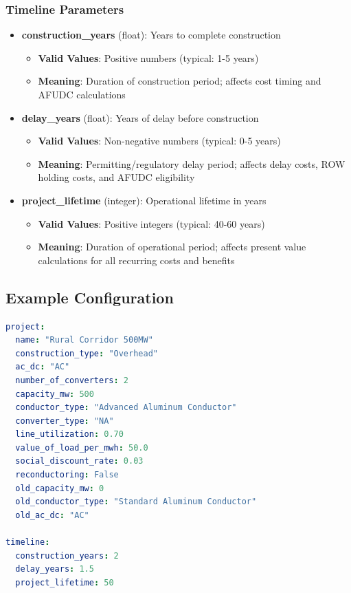 \documentclass[ctcc_full_documentation.tex]{subfiles}
\begin{document}
\subsubsection{Timeline Parameters}

\begin{itemize}
    \item \textbf{construction\_years} (float): Years to complete construction
    \begin{itemize}
        \item \textbf{Valid Values}: Positive numbers (typical: 1-5 years)
        \item \textbf{Meaning}: Duration of construction period; affects cost timing and AFUDC calculations
    \end{itemize}
    
    \item \textbf{delay\_years} (float): Years of delay before construction
    \begin{itemize}
        \item \textbf{Valid Values}: Non-negative numbers (typical: 0-5 years)
        \item \textbf{Meaning}: Permitting/regulatory delay period; affects delay costs, ROW holding costs, and AFUDC eligibility
    \end{itemize}
    
    \item \textbf{project\_lifetime} (integer): Operational lifetime in years
    \begin{itemize}
        \item \textbf{Valid Values}: Positive integers (typical: 40-60 years)
        \item \textbf{Meaning}: Duration of operational period; affects present value calculations for all recurring costs and benefits
    \end{itemize}
\end{itemize}

\subsection{Example Configuration}

\begin{lstlisting}[language=yaml]
project:
  name: "Rural Corridor 500MW"
  construction_type: "Overhead"
  ac_dc: "AC"
  number_of_converters: 2
  capacity_mw: 500
  conductor_type: "Advanced Aluminum Conductor"
  converter_type: "NA"
  line_utilization: 0.70
  value_of_load_per_mwh: 50.0
  social_discount_rate: 0.03
  reconductoring: False
  old_capacity_mw: 0
  old_conductor_type: "Standard Aluminum Conductor"
  old_ac_dc: "AC"

timeline:
  construction_years: 2
  delay_years: 1.5
  project_lifetime: 50
\end{lstlisting}
\end{document}
